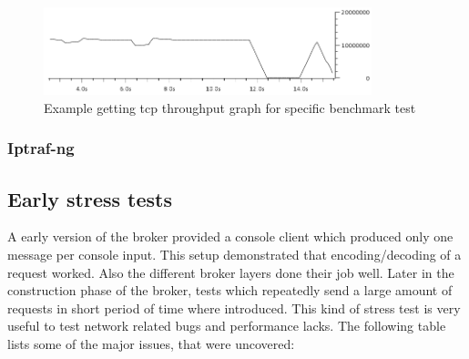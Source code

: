 \begin{figure}[H]
    \centering
    \includegraphics[width=0.85\textwidth]{images/benchmark/bench-1000-1-eth.png}
    \caption{Example getting tcp throughput graph for specific benchmark test}
\end{figure}

\subsubsection{Iptraf-ng}

\subsection{Early stress tests}
A early version of the broker provided a console client which produced only one
message per console input. This setup demonstrated that encoding/decoding of a
request worked. Also the different broker layers done their job well.
Later in the construction phase of the broker, tests which repeatedly send
a large amount of requests in short period of time where introduced. This kind
of stress test is very useful to test network related bugs and performance
lacks. The following table lists some of the major issues, that were uncovered: 

